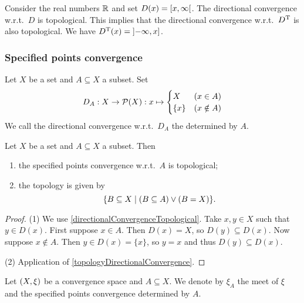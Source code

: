 \begin{example}
Consider the real numbers $\mathbb{R}$ and set $D(x) = \interval[co]{x,\infty}$. The directional convergence w.r.t.\ $D$ is topological. This implies that the directional convergence w.r.t.\ $D^{\mathrm{T}}$ is also topological. We have $D^\transp(x) = \interval[oc]{-\infty, x}$.
\end{example}

\subsubsection{Specified points convergence}
\begin{definition}
Let $X$ be a set and $A\subseteq X$ a subset. Set
\[ D_A: X \to \operatorname{\mathcal{P}}(X): x\mapsto \begin{cases}
X & (x\in A) \\
\{x\} & (x\notin A)
\end{cases} \]
We call the directional convergence w.r.t.\ $D_A$ the  determined by $A$.
\end{definition}

\begin{lemma}
Let $X$ be a set and $A\subseteq X$ a subset. Then
\begin{enumerate}
\item the specified points convergence w.r.t.\ $A$ is topological;
\item the topology is given by
\[ \setbuilder{B\subseteq X}{(B\subseteq A) \lor (B = X)}. \]
\end{enumerate}
\end{lemma}
\begin{proof}
(1) We use \ref{directionalConvergenceTopological}. Take $x,y\in X$ such that $y\in D(x)$. First suppose $x\in A$. Then $D(x) = X$, so $D(y)\subseteq D(x)$. Now suppose $x\notin A$. Then $y \in D(x) = \{x\}$, so $y = x$ and thus $D(y) \subseteq D(x)$.

(2) Application of \ref{topologyDirectionalConvergence}.
\end{proof}

\begin{definition}
Let $\sSet{X,\xi}$ be a convergence space and $A\subseteq X$. We denote by $\xi_A$ the meet of $\xi$ and the specified points convergence determined by $A$.
\end{definition}


